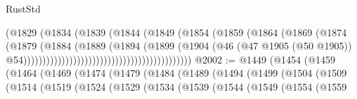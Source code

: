 \begin{lexlean}{RustStd}
\begin{coremodule}
{\begin{coremodule}
{{{{{{{{{{{{{{                                                          (@1829
                                                            (@1834
                                                              (@1839
                                                                (@1844
                                                                  (@1849
                                                                    (@1854
                                                                      (@1859
                                                                        (@1864
                                                                          (@1869
                                                                            (@1874
                                                                              (@1879
                                                                                (@1884
                                                                                  (@1889
                                                                                    (@1894
                                                                                      (@1899
                                                                                        (@1904
                                                                                          (@46
                                                                                            (@47
                                                                                              @1905
                                                                                              (@50
                                                                                                @1905))
                                                                                            @54))))))))))))))))))))))))))))))))))))))))))))
@2002 := @1449
    (@1454
      (@1459
        (@1464
          (@1469
            (@1474
              (@1479
                (@1484
                  (@1489
                    (@1494
                      (@1499
                        (@1504
                          (@1509
                            (@1514
                              (@1519
                                (@1524
                                  (@1529
                                    (@1534
                                      (@1539
                                        (@1544
                                          (@1549
                                            (@1554
                                              (@1559
}}}}}}}}}}}}}}
\end{coremodule}}
\end{coremodule}
\end{lexlean}
